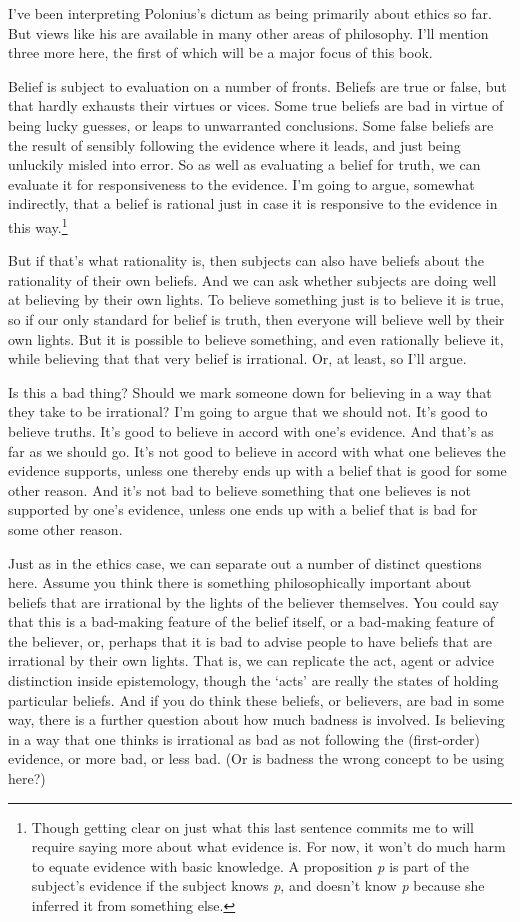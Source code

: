 \documentclass[
  10pt,
  letterpaper,
  twoside]{scrbook}
\begin{document}
I've been interpreting Polonius's dictum as being primarily about ethics
so far. But views like his are available in many other areas of
philosophy. I'll mention three more here, the first of which will be a
major focus of this book.

Belief is subject to evaluation on a number of fronts. Beliefs are true
or false, but that hardly exhausts their virtues or vices. Some true
beliefs are bad in virtue of being lucky guesses, or leaps to
unwarranted conclusions. Some false beliefs are the result of sensibly
following the evidence where it leads, and just being unluckily misled
into error. So as well as evaluating a belief for truth, we can evaluate
it for responsiveness to the evidence. I'm going to argue, somewhat
indirectly, that a belief is rational just in case it is responsive to
the evidence in this way.\footnote{Though getting clear on just what
  this last sentence commits me to will require saying more about what
  evidence is. For now, it won't do much harm to equate evidence with
  basic knowledge. A proposition \emph{p} is part of the subject's
  evidence if the subject knows \emph{p}, and doesn't know \emph{p}
  because she inferred it from something else.}

But if that's what rationality is, then subjects can also have beliefs
about the rationality of their own beliefs. And we can ask whether
subjects are doing well at believing by their own lights. To believe
something just is to believe it is true, so if our only standard for
belief is truth, then everyone will believe well by their own lights.
But it is possible to believe something, and even rationally believe it,
while believing that that very belief is irrational. Or, at least, so
I'll argue.

Is this a bad thing? Should we mark someone down for believing in a way
that they take to be irrational? I'm going to argue that we should not.
It's good to believe truths. It's good to believe in accord with one's
evidence. And that's as far as we should go. It's not good to believe in
accord with what one believes the evidence supports, unless one thereby
ends up with a belief that is good for some other reason. And it's not
bad to believe something that one believes is not supported by one's
evidence, unless one ends up with a belief that is bad for some other
reason.

Just as in the ethics case, we can separate out a number of distinct
questions here. Assume you think there is something philosophically
important about beliefs that are irrational by the lights of the
believer themselves. You could say that this is a bad-making feature of
the belief itself, or a bad-making feature of the believer, or, perhaps
that it is bad to advise people to have beliefs that are irrational by
their own lights. That is, we can replicate the act, agent or advice
distinction inside epistemology, though the `acts' are really the states
of holding particular beliefs. And if you do think these beliefs, or
believers, are bad in some way, there is a further question about how
much badness is involved. Is believing in a way that one thinks is
irrational as bad as not following the (first-order) evidence, or more
bad, or less bad. (Or is badness the wrong concept to be using here?)
\end{document}
